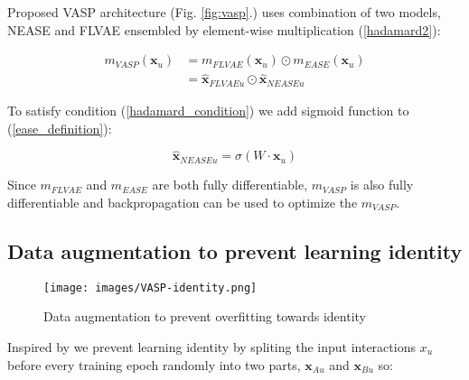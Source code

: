 \documentclass[conference]{IEEEtran}
\begin{document}
        Proposed VASP architecture (Fig. \ref{fig:vasp}.) uses combination of two models, NEASE and FLVAE ensembled by element-wise multiplication (\ref{hadamard2}):
    
            \begin{equation}\label{hadamard3}
                \begin{aligned}
                     m_{VASP}(\mathbf{x}_{u}) &= m_{FLVAE}(\mathbf{x}_{u}) \odot m_{EASE}(\mathbf{x}_{u}) \\
                                     &= \mathbf{\hat{x}}_{FLVAEu} \odot \mathbf{\hat{x}}_{NEASEu}
                \end{aligned}
            \end{equation}
        
        To satisfy condition (\ref{hadamard_condition}) we add sigmoid function to (\ref{ease_definition}):
            
            \begin{equation}\label{nease_definition} 
                \mathbf{\hat{x}}_{NEASEu} = \sigma(W \cdot \mathbf{x}_u)
            \end{equation}
        
        Since \(m_{FLVAE}\) and \(m_{EASE}\) are both fully differentiable, \(m_{VASP}\) is also fully differentiable and backpropagation can be used to optimize the \(m_{VASP}\).
        
    \subsection{Data augmentation to prevent learning identity}\label{pridentity} 
        \begin{figure*}[hb]
            \centering 
            \texttt{[image: images/VASP-identity.png]} 
            \caption{Data augmentation to prevent overfitting towards identity}
            \label{fig:vasp_identity}
        \end{figure*}
        
        Inspired by \cite{zhang2017split} we prevent learning identity by spliting the input interactions \(x_u\) before every training epoch randomly into two parts, \(\mathbf{x}_{Au}\) and \(\mathbf{x}_{Bu}\) so:
        
\end{document}
